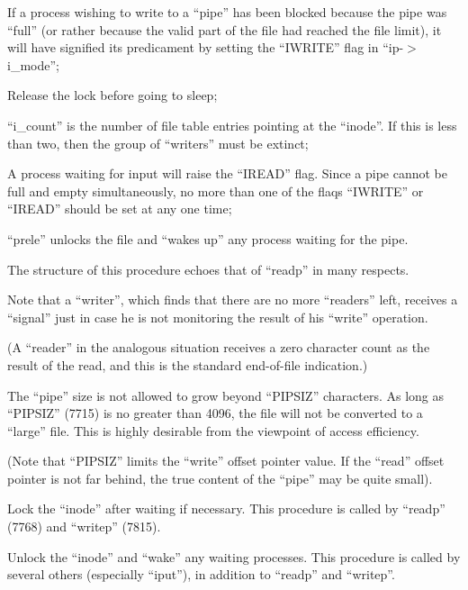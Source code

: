 \item[7776:] If a process wishing to write  to
      a ``pipe'' has been blocked because
      the pipe was  ``full''  (or  rather
      because  the  valid  part  of the
      file had reached the file limit),
      it will have signified its predicament by  setting  the  ``IWRITE''
      flag in ``ip-$>$i\_mode'';

\item[7786:] Release the lock before going  to
      sleep;

\item[7787:] ``i\_count'' is the number  of  file
      table  entries  pointing  at  the
      ``inode''. If  this  is  less  than
      two,  then the group of ``writers''
      must be extinct;

\item[7789:] A process waiting for input  will
raise  the ``IREAD'' flag.  Since a
pipe cannot  be  full  and  empty
simultaneously,  no more than one
of the flaqs ``IWRITE'' or  ``IREAD''
should be set at any one time;

\item[7799:] ``prele''  unlocks  the  file   and
      ``wakes  up''  any  process waiting
      for the pipe.
\ed


The structure of this procedure  echoes
that of ``readp'' in many respects.

\bd
\item[7828:] Note that a ``writer'', which finds
      that  there are no more ``readers''
      left, receives a ``signal'' just in
      case  he  is  not  monitoring the
      result of his ``write'' operation.

(A  ``reader''  in  the   analogous
situation receives a zero character count as the  result  of  the
read,  and  this  is the standard
end-of-file indication.)

\item[7835:] The ``pipe'' size is not allowed to
      grow  beyond ``PIPSIZ'' characters.
      As long as ``PIPSIZ'' (7715) is  no
      greater  than 4096, the file will
      not be  converted  to  a  ``large''
      file.  This  is  highly desirable
      from  the  viewpoint  of   access
      efficiency.

(Note that  ``PIPSIZ''  limits  the
``write''  offset pointer value. If
the ``read'' offset pointer is  not
far  behind,  the true content of
the ``pipe'' may be quite small).
\ed




Lock  the  ``inode''  after  waiting   if
necessary.  This procedure is called by
``readp'' (7768) and ``writep'' (7815).



Unlock the ``inode'' and ``wake''
any waiting processes. This procedure is called
by several others (especially  ``iput''),
in addition to ``readp'' and ``writep''.
